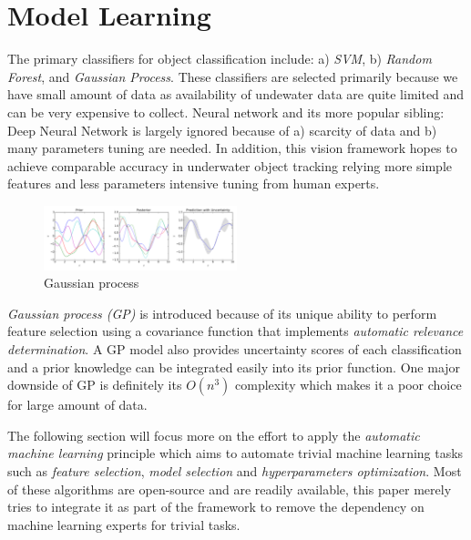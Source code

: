 \documentclass[fypca]{socreport}
\begin{document}

\chapter{Model Learning}

The primary classifiers for object classification include: a) \textit{SVM}, b)
\textit{Random Forest}, and \textit{Gaussian Process}. These classifiers are
selected primarily because we have small amount of data as availability of
undewater data are quite limited and can be very expensive to collect. Neural
network and its more popular sibling: Deep Neural Network is largely ignored
because of a) scarcity of data and b) many parameters tuning are needed. In
addition,  this vision framework hopes to achieve comparable accuracy in
underwater object tracking relying more simple features and less parameters
intensive tuning from human experts.

\begin{figure}[H]
\centering
  \includegraphics[width=0.5\textwidth, height=0.1\textheight]{gp.png}
  \caption{Gaussian process}
  \label{fig:gp}
\end{figure}

\textit{Gaussian process (GP)}  is introduced
because of its unique ability to perform feature selection using a covariance
function that implements \textit{automatic relevance determination}. A GP model
also provides uncertainty scores of each classification and a prior knowledge
can be integrated easily into its prior function. One major downside of GP is
definitely its $O(n^3)$ complexity which makes it a poor choice for large amount
of data.

The following section will focus more on the effort to apply the
\textit{automatic machine learning} principle which aims to automate trivial
machine learning tasks such as \textit{feature selection}, \textit{model
  selection} and \textit{hyperparameters optimization}. Most of these algorithms
are open-source and are readily available, this paper merely tries to integrate it
as part of the framework to remove the dependency on machine learning experts
for trivial tasks.
\end{document}
